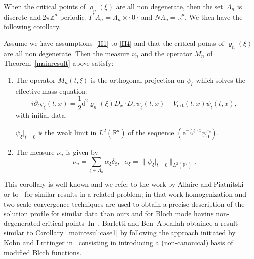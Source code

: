 \documentclass[AHL,Unicode,longabstracts]{cedram}
\DeclareMathOperator{\ext}{ext}
\newcommand*\R{{\mathbb R}}
\newcommand*\Z{{\mathbb Z}}
\newcommand*\eps{\varepsilon}
\numberwithin{equation}{section}
\newcommand{\ee}{{\mathrm e}}
\newcommand*{\dd}{\mathrm{d}}
\begin{document}
When the critical points of $\varrho_n(\xi)$ are all non degenerate, then the set~$\Lambda_n$ is discrete and $2\pi\Z^d$-periodic, $T^*\Lambda_n=\Lambda_n\times \{0\}$ and $N\Lambda_n= \R^d$. We then have the following corollary.

\begin{coro}\label{mainresul:case1}
Assume we have assumptions~\eqref{H1} to \eqref{H4} and that the critical points of $\varrho_n(\xi)$ are all non degenerate. Then the measure $\nu_{n}$ and the operator $M_{n}$ of Theorem~\ref{mainresult} above satisfy:
\begin{enumerate}
\item \label{1.3.1} The operator $M_{n}(t,\xi)$ is the orthogonal projection on $\psi_\xi$ which solves the effective mass equation:
\begin{equation}\label{eq:schroh}
i\partial_t \psi_\xi(t,x) =\frac{1}{2}\dd^2\varrho_{n}(\xi)D_x\cdot D_x \psi_\xi(t,x) +V_{\ext}(t,x)\psi_\xi(t,x),
\end{equation}
with initial data:
\begin{center}
$\psi_\xi|_{t=0}$ is the weak limit in $L^2(\R^d)$ of the sequence $\left({\ee}^{-\frac{i}{\eps_k} \xi \cdot x} \psi^{\eps_k}_{0}\right)$.
\end{center}
\item \label{1.3.2}The measure $\nu_{n}$ is given by
\[
\nu_{n}=\sum_{\xi\in \Lambda_{n}}\alpha_\xi \delta_\xi,\;\; \alpha_\xi = \| \psi_\xi|_{t=0}\|_{L^2(\R^d)}.
\]
\end{enumerate}
\end{coro}


This corollary is well known and we refer to the work by Allaire and Piatnitski~\cite{AP05} or to~\cite{AP06} for similar results in a related problem; in that work homogenization and two-scale convergence techniques are used to obtain a precise description of the solution profile for similar data than ours and for Bloch mode having non-degenerated critical points. In~\cite{BBA11}, Barletti and Ben~Abdallah obtained a result similar to Corollary~\ref{mainresul:case1} by following the approach initiated by Kohn and Luttinger in~\cite{LuttingerKohn} consisting in introducing a (non-canonical) basis of modified Bloch functions.

\end{document}
